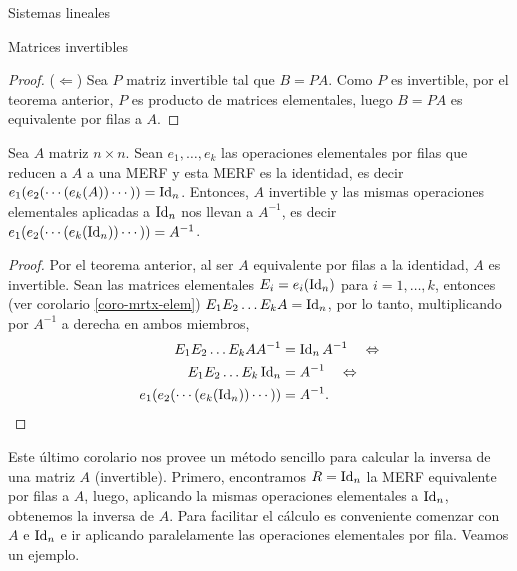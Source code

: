 \begin{chapter}{Sistemas lineales}
\begin{section}{Matrices invertibles}
\begin{proof}
                ($\Leftarrow$) Sea  $P$  matriz invertible tal que $B =PA$. Como $P$ es invertible, por el teorema anterior, $P$ es producto de matrices elementales, luego $B =PA$ es equivalente por filas a $A$.
            \end{proof}	
            
            \begin{corolario}\label{mtrx-inv-gauss}
                Sea $A$ matriz $n \times n$. Sean $e_1,\ldots,e_k$ las operaciones elementales por filas que reducen a $A$  a una MERF y esta MERF es la identidad,  es decir $e_1(e_{2}(\cdots(e_k(A))\cdots)) =\operatorname{Id}_n$. Entonces, $A$ invertible y  las mismas operaciones elementales aplicadas a $\operatorname{Id}_n$ nos llevan a $A^{-1}$,  es decir $e_1(e_{2}(\cdots(e_k(\operatorname{Id}_n))\cdots)) =A^{-1}$.
            \end{corolario}
            \begin{proof} Por el teorema anterior, al ser $A$ equivalente por filas a la identidad, $A$ es invertible.  
                Sean las matrices elementales  $E_i = e_i(\operatorname{Id}_n)$ para $i=1,\ldots,k$,  entonces (ver corolario \ref{coro-mrtx-elem}) $E_1E_2\ldots E_kA = \operatorname{Id}_n$, por lo tanto, multiplicando por $A^{-1}$ a derecha en ambos miembros,    
                \begin{align*}
                E_1E_2\ldots E_kA A^{-1}&= \operatorname{Id}_nA^{-1} \quad \Leftrightarrow \\
                E_1E_2\ldots E_k\operatorname{Id}_n&= A^{-1} \quad \Leftrightarrow \\
                e_1(e_{2}(\cdots(e_k(\operatorname{Id}_n))\cdots)) &=A^{-1}.
                \end{align*}
            \end{proof}
            
            Este último corolario nos provee un método sencillo para calcular la inversa de una matriz $A$ (invertible). Primero,  encontramos $R = \operatorname{Id}_n$ la MERF  equivalente por filas a $A$, luego, aplicando la mismas operaciones elementales a $\operatorname{Id}_n$, obtenemos la inversa de $A$. Para facilitar el cálculo es  conveniente comenzar con $A$ e $\operatorname{Id}_n$ e ir aplicando paralelamente las operaciones elementales por fila. Veamos un ejemplo.


\end{section}
\end{chapter}
